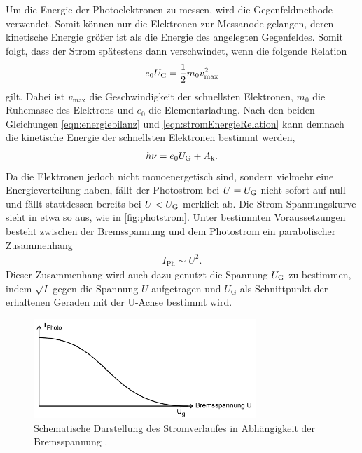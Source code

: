 \noindent
Um die Energie der Photoelektronen zu messen, wird die Gegenfeldmethode verwendet. Somit können nur die Elektronen zur Messanode gelangen, deren kinetische Energie
größer ist als die Energie des angelegten Gegenfeldes. Somit folgt, dass der Strom spätestens dann verschwindet, wenn die folgende Relation 
\begin{align}
    e_0 U_{\text G}=\frac 12 m_0v_{\text{max}}^2
    \label{eqn:stromEnergieRelation}
\end{align}
gilt. Dabei ist $v_{\text{max}}$ die Geschwindigkeit der schnellsten Elektronen, $m_0$ die Ruhemasse des Elektrons und $e_0$ die Elementarladung. Nach den beiden
Gleichungen \eqref{eqn:energiebilanz} und \eqref{eqn:stromEnergieRelation} kann demnach die kinetische Energie der schnellsten Elektronen bestimmt werden,
\begin{align}
    h\nu = e_0 U_{\text G} + A_{\text k}.
    \label{eqn:energieElektr}
\end{align}
Da die Elektronen jedoch nicht monoenergetisch sind, sondern vielmehr eine Energieverteilung haben, fällt der Photostrom bei $U=U_{\text G}$ nicht sofort auf null und fällt
stattdessen bereits bei $U<U_{\text G}$ merklich ab. Die Strom-Spannungskurve sieht in etwa so aus, wie in \autoref{fig:photstrom}. Unter bestimmten Voraussetzungen besteht zwischen der Bremsspannung
und dem Photostrom ein parabolischer Zusammenhang
\begin{align}
    I_{\text{Ph}} \sim U^2.
    \label{eqn:wurzelIGesetz}
\end{align}
Dieser Zusammenhang wird auch dazu genutzt die Spannung $U_{\text G}$ zu bestimmen, indem $\sqrt I$ gegen die Spannung $U$ aufgetragen und $U_{\text{G}}$ als Schnittpunkt der 
erhaltenen Geraden mit der U-Achse bestimmt wird.
\begin{figure}[H]
    \centering
    \includegraphics[width = 0.75\textwidth]{data/Photostrom.png}
    \caption{Schematische Darstellung des Stromverlaufes in Abhängigkeit der Bremsspannung \cite{Anleitung500}.}
    \label{fig:photstrom}
\end{figure}